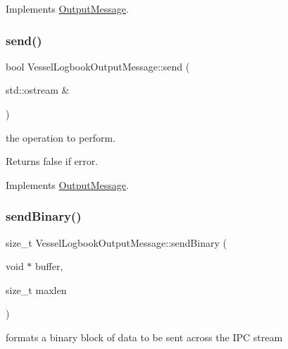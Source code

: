 Implements \mbox{\hyperlink{class_output_message_a949d8350d98202608e4248fe6dafa10f}{Output\+Message}}.

\mbox{\label{class_vessel_logbook_output_message_a39a68c1cc103eef690f75c4881ceaee4}} 
\subsubsection{\texorpdfstring{send()}{send()}}
{\footnotesize\ttfamily bool Vessel\+Logbook\+Output\+Message\+::send (\begin{DoxyParamCaption}\item[{std\+::ostream \&}]{ }\end{DoxyParamCaption})\hspace{0.3cm}{\ttfamily [virtual]}}



the operation to perform. 

\begin{DoxyReturn}{Returns}
false if error. 
\end{DoxyReturn}


Implements \mbox{\hyperlink{class_output_message_a6f817de4d3430dc98521431385b95328}{Output\+Message}}.

\mbox{\label{class_vessel_logbook_output_message_af1453fd8c283bbf6eb7f2ef00bc33a5f}} 
\subsubsection{\texorpdfstring{sendBinary()}{sendBinary()}}
{\footnotesize\ttfamily size\+\_\+t Vessel\+Logbook\+Output\+Message\+::send\+Binary (\begin{DoxyParamCaption}\item[{void $\ast$}]{buffer,  }\item[{size\+\_\+t}]{maxlen }\end{DoxyParamCaption})\hspace{0.3cm}{\ttfamily [virtual]}}



formats a binary block of data to be sent across the I\+PC stream 

